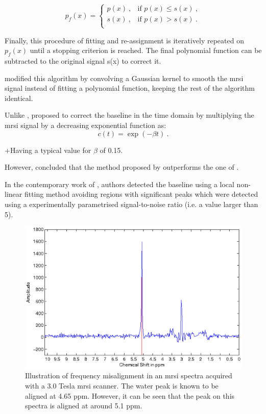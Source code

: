 \begin{enumerate}[leftmargin=*]
\begin{equation}
	p_f(x) = 
	\begin{cases}
		p(x) \ , & \text{if $p(x) \leq s(x)$} \ , \\
		s(x) \ , & \text{if $p(x) > s(x)$} \ . \\
	\end{cases}
	\label{eq:lieber}
\end{equation}

Finally, this procedure of fitting and re-assignment is iteratively repeated on $p_f(x)$ until a stopping criterion is reached. The final polynomial function can be subtracted to the original signal s(x) to correct it.

\cite{Parfait2012} modified this algorithm by convolving a Gaussian kernel to smooth the \ac{mrsi} signal instead of fitting a polynomial function, keeping the rest of the algorithm identical. 

Unlike \cite{Lieber2003}, \cite{Devos2004} proposed to correct the baseline in the time domain by multiplying the \ac{mrsi} signal by a decreasing exponential function as:
\begin{equation}
	c(t) = \exp (- \beta t) \ .
	\label{eq:devos}
\end{equation}

+\noindent Having a typical value for $\beta$ of 0.15.

However, \cite{Parfait2012} concluded that the method proposed by \cite{Lieber2003} outperforms the one of \cite{Devos2004}.

In the contemporary work of \cite{Tiwari2012}, authors detected the baseline using a local non-linear fitting method avoiding regions with significant peaks which were  detected using a experimentally parametrised signal-to-noise ratio (i.e. a value larger than 5).

\begin{figure}
\centering
	\includegraphics[width=0.7\linewidth]{03_image_processing/03_preprocessing/figures/frequency/frequency.eps}
	\caption{Illustration of frequency misalignment in an \ac{mrsi} spectra acquired with a 3.0 Tesla \ac{mrsi} scanner. The water peak is known to be aligned at 4.65 ppm. However, it can be seen that the peak on this spectra is aligned at around 5.1 ppm.}
	\label{fig:frequency}
\end{figure}


\end{enumerate}
